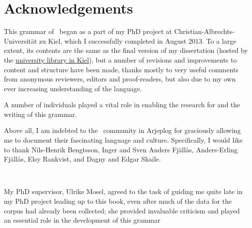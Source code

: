 %



\chapter*{Acknowledgements}\label{acknowledgements}\hypertarget{acknowledgements}{}

This grammar of \PS\ began as a part of my PhD project at Christian-Albrechts-Universität zu Kiel, which I successfully completed in August 2013. To a large extent, its contents are the same as the final version of my dissertation (hosted by the \href{http://macau.uni-kiel.de/receive/dissertation_diss_00013059}{university library in Kiel}), but a number of revisions and improvements to content and structure have been made, thanks mostly to very useful comments from anonymous reviewers, editors and proof-readers, but also due to my own ever increasing understanding of the language. 

A number of individuals played a vital role in enabling the research for and the writing of this grammar. 

\vspace{10pt}
Above all, I am indebted to the \PS\ community in Arjeplog for graciously allowing me to document their fascinating language and culture. %
Specifically, I would like to thank Nils-Henrik Bengtsson, Inger and Sven Anders Fjällås, Anders-Erling Fjällås, Elsy Rankvist, and Dagny and Edgar Skaile. 

{\centering{}\\}
\vspace{10pt}

My PhD supervisor, Ulrike Mosel, agreed to the task of guiding me quite late in my PhD project leading up to this book, even after much of the data for the corpus had already been collected; she provided invaluable criticism and played an essential role in the development of this grammar \textendash\  %

